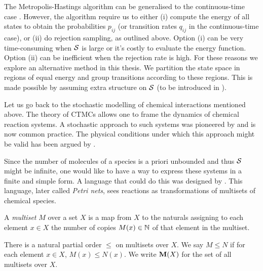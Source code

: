 The Metropolis-Hastings algorithm can be generalised
to the continuous-time case \citep{diaconis}.
However, the algorithm require us to either
(i) compute the energy of all states to obtain the probabilities
$p_{ij}$ (or transition rates $q_{ij}$ in the continuous-time case),
or (ii) do rejection sampling, as outlined above.
Option (i) can be very time-consuming when $\mathcal{S}$ is large
or it's costly to evaluate the energy function.
Option (ii) can be inefficient when the rejection rate is high.
For these reasons we explore an alternative method in this thesis.
We partition the state space in regions of equal energy
and group transitions according to these regions.
This is made possible by assuming extra structure on $\mathcal{S}$
(to be introduced in ).

Let us go back to the stochastic modelling of
chemical interactions mentioned above.
The theory of CTMCs allows one to frame
the dynamics of chemical reaction systems.
A stochastic approach to such systems
was pioneered by \citet{delbruck}
and is now common practice. %
The physical conditions under which this approach might be valid
has been argued by \citet{gillespie76}.

Since the number of molecules of a species
is a priori unbounded and thus $\mathcal{S}$ might be infinite,
one would like to have a way to express
these systems in a finite and simple form.
A language that could do this was designed by \citet{petri}.
This language, later called \emph{Petri nets},
sees reactions as transformations of
multisets of chemical species.

\begin{definition}
  A \emph{multiset} $M$ over a set $X$ is a map from $X$ to
  the naturals assigning to each element $x \in X$
  the number of copies $M(x) \in \mathbb{N}$ of that element
  in the multiset.
\end{definition}

There is a natural partial order $\leqslant$ on multisets over $X$.
We say $M \leqslant N$ if for each element $x \in X$,
$M(x) \leqslant N(x)$.
We write $\mathbf{M}(X)$ for the set of all multisets over $X$.

